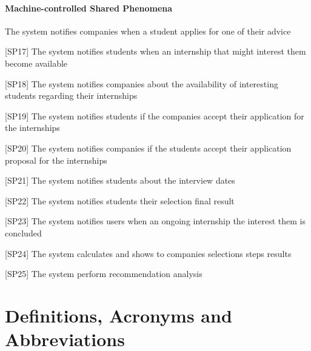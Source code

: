 				

					
					
				\paragraph{Machine-controlled Shared Phenomena}
					\begin{flushleft}
						[SP16] The system notifies companies when a student applies for one of their advice
						
						[SP17] The system notifies students when an internship that might interest them become available
						
						[SP18] The system notifies companies about the availability of interesting students regarding their internships
						
						[SP19] The system notifies students if the companies accept their application for the internships
						
						[SP20] The system notifies companies if the students accept their application proposal for the internships
					
						[SP21] The system notifies students about the interview dates
						
						[SP22] The system notifies students their selection final result
						
						[SP23] The system notifies users when an ongoing internship the interest them is concluded
						
						[SP24] The system calculates and shows to companies selections steps results
						
						[SP25] The system perform recommendation analysis
					\end{flushleft} 
					
	\section{Definitions, Acronyms and Abbreviations}
